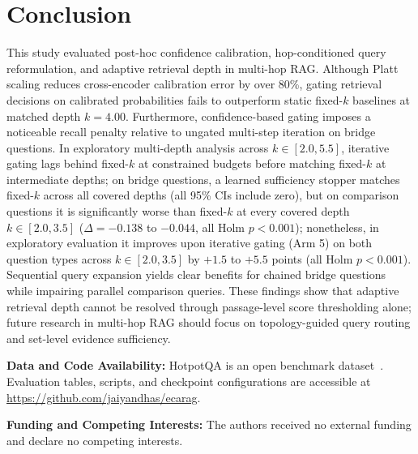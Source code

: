 \documentclass{article}
\begin{document}
\section{Conclusion}
\label{sec:conclusion}
This study evaluated post-hoc confidence calibration, hop-conditioned query reformulation, and adaptive retrieval depth in multi-hop RAG. Although Platt scaling reduces cross-encoder calibration error by over 80\%, gating retrieval decisions on calibrated probabilities fails to outperform static fixed-$k$ baselines at matched depth $k=4.00$. Furthermore, confidence-based gating imposes a noticeable recall penalty relative to ungated multi-step iteration on bridge questions. In exploratory multi-depth analysis across $k \in [2.0, 5.5]$, iterative gating lags behind fixed-$k$ at constrained budgets before matching fixed-$k$ at intermediate depths; on bridge questions, a learned sufficiency stopper matches fixed-$k$ across all covered depths (all 95\% CIs include zero), but on comparison questions it is significantly worse than fixed-$k$ at every covered depth $k \in [2.0, 3.5]$ ($\Delta = -0.138$ to $-0.044$, all Holm $p < 0.001$); nonetheless, in exploratory evaluation it improves upon iterative gating (Arm 5) on both question types across $k \in [2.0, 3.5]$ by $+1.5$ to $+5.5$ points (all Holm $p < 0.001$). Sequential query expansion yields clear benefits for chained bridge questions while impairing parallel comparison queries. These findings show that adaptive retrieval depth cannot be resolved through passage-level score thresholding alone; future research in multi-hop RAG should focus on topology-guided query routing and set-level evidence sufficiency.

\noindent\textbf{Data and Code Availability:} HotpotQA is an open benchmark dataset~\cite{yang2018hotpotqa}. Evaluation tables, scripts, and checkpoint configurations are accessible at \url{https://github.com/jaiyandhas/ecarag}.

\vspace{1pt}
\noindent\textbf{Funding and Competing Interests:} The authors received no external funding and declare no competing interests.



\end{document}
